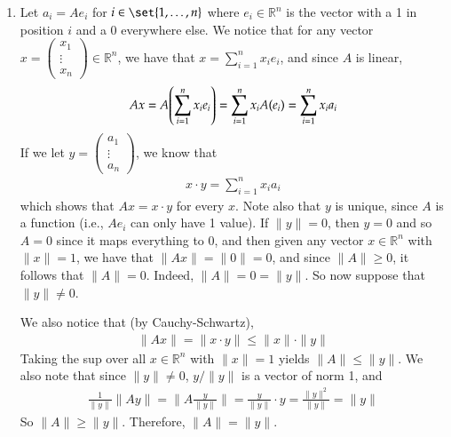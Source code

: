 \documentclass[12pt]{article}
\theoremstyle{definitionstyle}
\def\mbb#1{\mathbb{#1}}
\def \R{\mbb{R}}
\newcommand{\mg}[1]{\| #1 \|}
\begin{document}
\begin{enumerate}[leftmargin=\labelsep]
		\item Let $a_i = Ae_i$ for $i \in \set{1, \ldots, n}$ where $e_i \in \R^n$ is the vector with a 1 in position $i$ and a 0 everywhere else. We notice that for any vector $x = \begin{pmatrix}
			x_1 \\
			\vdots \\
			x_n
		\end{pmatrix} \in \R^n$, we have that $x = \sum_{i=1}^n x_ie_i$, and since $A$ is linear,
		\begin{align*}
			Ax = A\qty(\sum_{i=1}^n x_ie_i) = \sum_{i=1}^n x_i A(e_i) = \sum_{i=1}^n x_i a_i
		\end{align*}
		If we let $y = \begin{pmatrix}
			a_1 \\
			\vdots \\
			a_n
		\end{pmatrix}$, we know that 
		\begin{align*}
			x \cdot y = \sum_{i=1}^n x_ia_i
		\end{align*}
		which shows that $Ax = x \cdot y$ for every $x$. Note also that $y$ is unique, since $A$ is a function (i.e., $Ae_i$ can only have 1 value). If $\mg{y} = 0$, then $y = 0$ and so $A = 0$ since it maps everything to 0, and then given any vector $x \in \R^n$ with $\mg{x} = 1$, we have that $\mg{Ax} = \mg{0} = 0$, and since $\mg{A} \geq 0$, it follows that $\mg{A} = 0$. Indeed, $\mg{A} = 0 = \mg{y}$. So now suppose that $\mg{y} \neq 0$.
		
		 We also notice that (by Cauchy-Schwartz),
		\begin{align*}
			\mg{Ax} = \mg{x \cdot y} \leq \mg{x} \cdot \mg{y}
		\end{align*}
		Taking the sup over all $x \in \R^n$ with $\mg{x} = 1$ yields $\mg{A} \leq \mg{y}$. We also note that since $\mg{y} \neq 0$, $y/\mg{y}$ is a vector of norm 1, and
		\begin{align*}
			\frac{1}{\mg{y}} \mg{Ay} = \mg{A \frac{y}{\mg{y}}} = \frac{y}{\mg{y}} \cdot y = \frac{\mg{y}^2}{\mg{y}} = \mg{y}
		\end{align*}
		So $\mg{A} \geq \mg{y}$. Therefore, $\mg{A} = \mg{y}$.
		

\end{enumerate}
\end{document}
